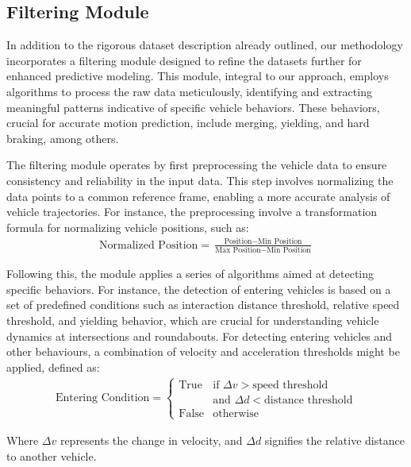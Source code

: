 \subsection{Filtering Module} \label{sec:filtering_module}

In addition to the rigorous dataset description already outlined, our methodology incorporates a filtering module designed to refine the datasets further for enhanced predictive modeling. This module, integral to our approach, employs algorithms to process the raw data meticulously, identifying and extracting meaningful patterns indicative of specific vehicle behaviors. These behaviors, crucial for accurate motion prediction, include merging, yielding, and hard braking, among others.

The filtering module operates by first preprocessing the vehicle data to ensure consistency and reliability in the input data. This step involves normalizing the data points to a common reference frame, enabling a more accurate analysis of vehicle trajectories. For instance, the preprocessing involve a transformation formula for normalizing vehicle positions, such as:
\begin{align} 
    \text{Normalized Position} = \frac{\text{Position} - \text{Min Position}}{\text{Max Position} - \text{Min Position}}
\end{align}

Following this, the module applies a series of algorithms aimed at detecting specific behaviors. For instance, the detection of entering vehicles is based on a set of predefined conditions such as interaction distance threshold, relative speed threshold, and yielding behavior, which are crucial for understanding vehicle dynamics at intersections and roundabouts. For detecting entering vehicles and other behaviours, a combination of velocity and acceleration thresholds might be applied, defined as:
\begin{align} 
    \text{Entering Condition} = \left\{
\begin{array}{ll}
\text{True} & \text{if } \Delta v > \text{speed threshold} \\
& \text{and } \Delta d < \text{distance threshold} \\
\text{False} & \text{otherwise}
\end{array}
\right.
\end{align}

Where \(\Delta v\) represents the change in velocity, and \(\Delta d\) signifies the relative distance to another vehicle.


